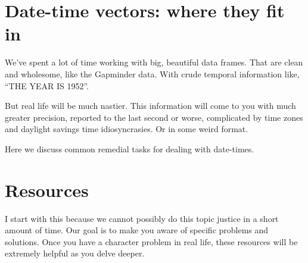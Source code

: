 \documentclass[
]{book}
\begin{document}
\hypertarget{date-time-vectors-where-they-fit-in}{%
\section{Date-time vectors: where they fit in}\label{date-time-vectors-where-they-fit-in}}

We've spent a lot of time working with big, beautiful data frames. That are clean and wholesome, like the Gapminder data. With crude temporal information like, ``THE YEAR IS 1952''.

But real life will be much nastier. This information will come to you with much greater precision, reported to the last second or worse, complicated by time zones and daylight savings time idiosyncrasies. Or in some weird format.

Here we discuss common remedial tasks for dealing with date-times.

\hypertarget{resources}{%
\section{Resources}\label{resources}}

I start with this because we cannot possibly do this topic justice in a short amount of time. Our goal is to make you aware of specific problems and solutions. Once you have a character problem in real life, these resources will be extremely helpful as you delve deeper.
\end{document}
